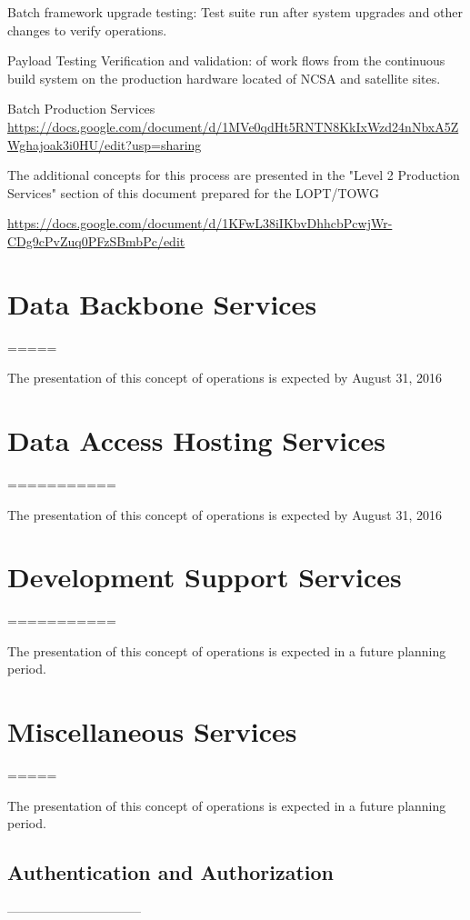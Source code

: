 Batch framework upgrade testing: Test suite run after system upgrades
and other  changes to verify operations.

Payload Testing Verification and validation: of work flows from the
continuous build system on the production hardware located of NCSA and
satellite sites.


Batch Production Services \url{https://docs.google.com/document/d/1MVe0qdHt5RNTN8KkIxWzd24nNbxA5ZWghajoak3i0HU/edit?usp=sharing}

The additional concepts for this process are presented in the "Level 2
Production Services" section of this document prepared for the
LOPT/TOWG

\url{https://docs.google.com/document/d/1KFwL38iIKbvDhhcbPcwjWr-CDg9cPvZuq0PFzSBmbPc/edit}


\section{ Data Backbone Services}
=====

The presentation of this concept of operations is expected by August 31, 2016

\section{ Data Access Hosting Services}
===========

The presentation of this concept of operations is expected by August 31, 2016


\section{ Development Support Services}
===========

The presentation of this concept of operations is expected in a future planning period.

\section{ Miscellaneous Services}
=====

The presentation of this concept of operations is expected in a future planning period.



\subsection{Authentication and Authorization}
--------------------------------

